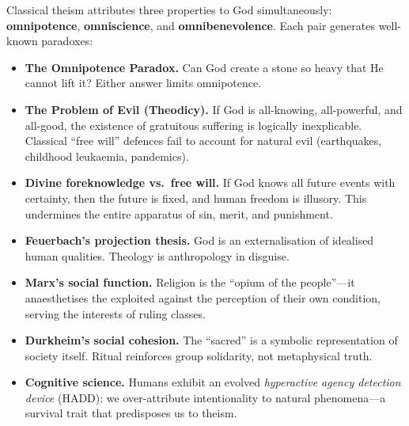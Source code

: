 \documentclass[11pt,twoside]{article}
\begin{document}
\begin{scheda}

Classical theism attributes three properties to God simultaneously:
\textbf{omnipotence}, \textbf{omniscience}, and \textbf{omnibenevolence}.
Each pair generates well-known paradoxes:

\begin{itemize}
  \item \textbf{The Omnipotence Paradox.}
    Can God create a stone so heavy that He cannot lift it?  Either answer
    limits omnipotence.
  \item \textbf{The Problem of Evil (Theodicy).}
    If God is all-knowing, all-powerful, and all-good, the existence of
    gratuitous suffering is logically inexplicable.  Classical ``free will''
    defences fail to account for natural evil
    (earthquakes, childhood leukaemia, pandemics).
  \item \textbf{Divine foreknowledge vs.\ free will.}
    If God knows all future events with certainty, then the future is fixed,
    and human freedom is illusory.  This undermines the entire apparatus of
    sin, merit, and punishment.
\end{itemize}
\end{scheda}

\begin{scheda}

\begin{itemize}
  \item \textbf{Feuerbach's projection thesis.}
    God is an externalisation of idealised human qualities.  Theology is
    anthropology in disguise.
  \item \textbf{Marx's social function.}
    Religion is the ``opium of the people''---it
    anaesthetises the exploited against the perception of their own condition,
    serving the interests of ruling classes.
  \item \textbf{Durkheim's social cohesion.}
    The ``sacred'' is a symbolic representation of society itself.  Ritual
    reinforces group solidarity, not metaphysical truth.
  \item \textbf{Cognitive science.}
    Humans exhibit an evolved \emph{hyperactive agency detection
    device} (HADD): we over-attribute intentionality to
    natural phenomena---a survival trait that predisposes us to theism.
\end{itemize}
\end{scheda}
\end{document}

